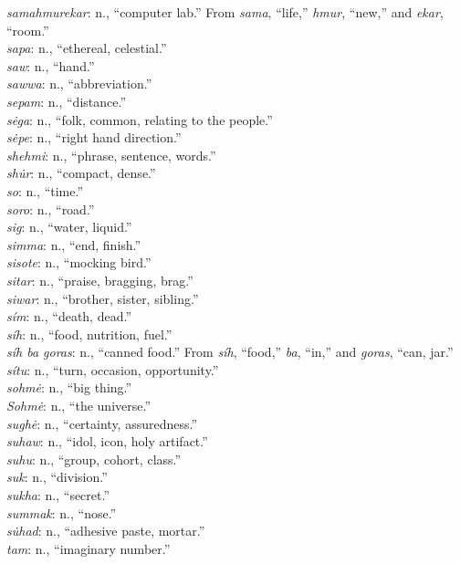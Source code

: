 \documentclass{article}[10pt]
\begin{document}
\begin{multicols}{3}
\emph{samahmurekar}: n., ``computer lab.'' From \emph{sama}, ``life,'' \emph{hmur}, ``new,'' and \emph{ekar}, ``room.''\\
\emph{sapa}: n., ``ethereal, celestial.''\\
\emph{saw}: n., ``hand.''\\
\emph{sawwa}: n., ``abbreviation.''\\
\emph{sepam}: n., ``distance.''\\
\emph{s\.{e}ga}: n., ``folk, common, relating to the people.''\\
\emph{s\.{e}pe}: n., ``right hand direction.''\\
\emph{shehmi}: n., ``phrase, sentence, words.''\\
\emph{sh\.{u}r}: n., ``compact, dense.''\\
\emph{so}: n., ``time.''\\
\emph{soro}: n., ``road.''\\
\emph{sig}: n., ``water, liquid.''\\
\emph{simma}: n., ``end, finish.''\\
\emph{sisote}: n., ``mocking bird.''\\
\emph{sitar}: n., ``praise, bragging, brag.''\\
\emph{siwar}: n., ``brother, sister, sibling.''\\
\emph{s\'{i}m}: n., ``death, dead.''\\
\emph{s\'{i}h}: n., ``food, nutrition, fuel.''\\
\emph{s\'{i}h ba goras}: n., ``canned food.'' From \emph{s\'{i}h}, ``food,'' \emph{ba}, ``in,'' and \emph{goras}, ``can, jar.''\\
\emph{s\'{i}tu}: n., ``turn, occasion, opportunity.''\\
\emph{sohm\.{e}}: n., ``big thing.''\\
\emph{Sohm\.{e}}: n., ``the universe.''\\
\emph{sugh\.{e}}: n., ``certainty, assuredness.''\\
\emph{suhaw}: n., ``idol, icon, holy artifact.''\\
\emph{suhu}: n., ``group, cohort, class.''\\
\emph{suk}: n., ``division.''\\
\emph{sukha}: n., ``secret.''\\
\emph{summak}: n., ``nose.''\\
\emph{s\.{u}had}: n., ``adhesive paste, mortar.''\\
\emph{tam}: n., ``imaginary number.''\\

\end{multicols}
\end{document}
